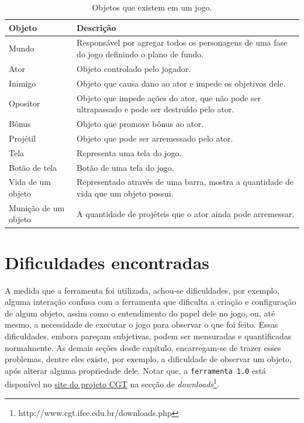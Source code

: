 \documentclass[12pt,twoside,openright,a4paper,english,brazil,sumario=tradicional]{abntex2}
\begin{document}
\begin{table}[htb]
\centering
\begin{tabular}{| l | p{7cm} |}
      \hline
      \textbf{Objeto} & \textbf{Descrição} \\
      \hline
      Mundo & Responsável por agregar todos os personagens de uma fase do jogo definindo o plano de fundo.  \\
      \hline
      Ator & Objeto controlado pelo jogador. \\
      \hline
      Inimigo & Objeto que causa dano ao ator e impede os objetivos dele. \\
      \hline
      Opositor & Objeto que impede ações do ator, que não pode ser ultrapassado e pode ser destruído pelo ator.  \\
      \hline
      Bônus & Objeto que promove bônus ao ator. \\
      \hline
      Projétil & Objeto que pode ser arremessado pelo ator. \\
      \hline
      Tela & Representa uma tela do jogo. \\
      \hline
      Botão de tela & Botão de uma tela do jogo. \\
      \hline
      Vida de um objeto & Representado através de uma barra, mostra a quantidade de vida que um objeto possui. \\
      \hline
      Munição de um objeto & A quantidade de projéteis que o ator ainda pode arremessar. \\
      \hline
   \end{tabular}
\caption{Objetos que existem em um jogo.}
\label{table:objetos-desc}
\end{table}

\section{Dificuldades encontradas}
\label{sec:dificuldades}
A medida que a ferramenta foi utilizada, achou-se dificuldades, por exemplo, alguma interação confusa com a ferramenta que dificulta a criação e configuração de algum objeto, assim como o entendimento do papel dele no jogo, ou, até mesmo, a necessidade de executar o jogo para observar o que foi feito. Essas dificuldades, embora pareçam subjetivas, podem ser mensuradas e quantificadas normalmente. As demais seções desde capítulo, encarregam-se de trazer esses problemas, dentre eles existe, por exemplo, a dificuldade de observar um objeto, após alterar alguma propriedade dele.
Notar que, a \texttt{ferramenta 1.0} está disponível no \href{http://www.cgt.ifce.edu.br/downloads.php}{site do projeto CGT} na secção de \emph{downloads}\footnote{http://www.cgt.ifce.edu.br/downloads.php}.
\end{document}
